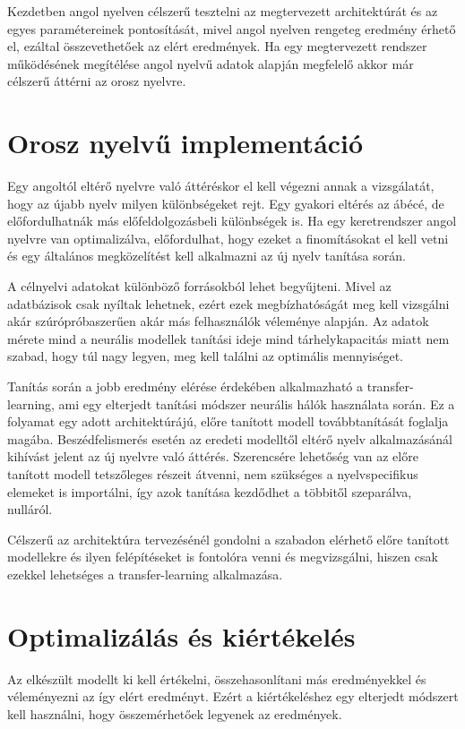Kezdetben angol nyelven célszerű tesztelni az megtervezett architektúrát és az egyes paramétereinek pontosítását, mivel angol nyelven rengeteg eredmény érhető el, ezáltal összevethetőek az elért eredmények. Ha egy megtervezett rendszer működésének megítélése angol nyelvű adatok alapján megfelelő akkor már célszerű áttérni az orosz nyelvre. 

\section{Orosz nyelvű implementáció}

Egy angoltól eltérő nyelvre való áttéréskor el kell végezni annak a vizsgálatát, hogy az újabb nyelv milyen különbségeket rejt. Egy gyakori eltérés az ábécé, de előfordulhatnák más előfeldolgozásbeli különbségek is. Ha egy keretrendszer angol nyelvre van optimalizálva, előfordulhat, hogy ezeket a finomításokat el kell vetni és egy általános megközelítést kell alkalmazni az új nyelv tanítása során.

A célnyelvi adatokat különböző forrásokból lehet begyűjteni. Mivel az adatbázisok csak nyíltak lehetnek, ezért ezek megbízhatóságát meg kell vizsgálni akár szúrópróbaszerűen akár más felhasználók véleménye alapján. Az adatok mérete mind a neurális modellek tanítási ideje mind tárhelykapacitás miatt nem szabad, hogy túl nagy legyen, meg kell találni az optimális mennyiséget.

Tanítás során a jobb eredmény elérése érdekében alkalmazható a transfer-learning, ami egy elterjedt tanítási módszer neurális hálók használata során. Ez a folyamat egy adott architektúrájú, előre tanított modell továbbtanítását foglalja magába. Beszédfelismerés esetén az eredeti modelltől eltérő nyelv alkalmazásánál kihívást jelent az új nyelvre való áttérés. Szerencsére lehetőség van az előre tanított modell tetszőleges részeit átvenni, nem szükséges a nyelvspecifikus elemeket is importálni, így azok tanítása kezdődhet a többitől szeparálva, nulláról.

Célszerű az architektúra tervezésénél gondolni a szabadon elérhető előre tanított modellekre és ilyen felépítéseket is fontolóra venni és megvizsgálni, hiszen csak ezekkel lehetséges a transfer-learning alkalmazása.

\section{Optimalizálás és kiértékelés}

Az elkészült modellt ki kell értékelni, összehasonlítani más eredményekkel és véleményezni az így elért eredményt. Ezért a kiértékeléshez egy elterjedt módszert kell használni, hogy összemérhetőek legyenek az eredmények.


